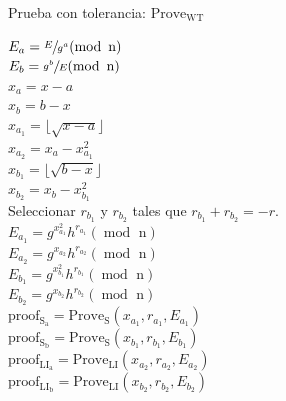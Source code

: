 \begin{minipage}{0.9\textwidth}
    \begin{algorithm}[H] \label{alg:prove wt}
        \caption{Prueba con tolerancia: $\operatorname{Prove_{WT}}$}

        $E_{a} = \sfrac{E}{g^{a}} (\operatorname{mod} \text{ n})$ \\
        $E_{b} = \sfrac{g^{b}}{E} (\operatorname{mod} \text{ n})$ \\
        $x_{a} = x - a$ \\
        $x_{b} = b - x$ \\
        $x_{a_{1}} = \lfloor \sqrt{x - a} \rfloor$ \\
        $x_{a_{2}} = x_{a} - x_{a_{1}}^{2}$ \\
        $x_{b_{1}} = \lfloor \sqrt{b - x} \rfloor$ \\
        $x_{b_{2}} = x_{b} - x_{b_{1}}^{2}$ \\
        Seleccionar $r_{b_{1}}$ y $r_{b_{2}}$ tales que $r_{b_{1}} + r_{b_{2}} = -r$. \\
        $E_{a_{1}} = g^{x^{2}_{a_{1}}}h^{r_{a_{1}}} (\operatorname{mod} \text{ n})$ \\
        $E_{a_{2}} = g^{x_{a_{2}}}h^{r_{a_{2}}} (\operatorname{mod} \text{ n})$ \\
        $E_{b_{1}} = g^{x^{2}_{b_{1}}}h^{r_{b_{1}}} (\operatorname{mod} \text{ n})$ \\
        $E_{b_{2}} = g^{x_{b_{2}}}h^{r_{b_{2}}} (\operatorname{mod} \text{ n})$ \\
        $\operatorname{proof_{S_{a}}} = \operatorname{Prove_{S}}(x_{a_{1}}, r_{a_{1}}, E_{a_{1}})$ \\
        $\operatorname{proof_{S_{b}}} = \operatorname{Prove_{S}}(x_{b_{1}}, r_{b_{1}}, E_{b_{1}})$ \\
        $\operatorname{proof_{LI_{a}}} = \operatorname{Prove_{LI}}(x_{a_{2}}, r_{a_{2}}, E_{a_{2}})$ \\
        $\operatorname{proof_{LI_{b}}} = \operatorname{Prove_{LI}}(x_{b_{2}}, r_{b_{2}}, E_{b_{2}})$ \\

    \end{algorithm}
\end{minipage}

